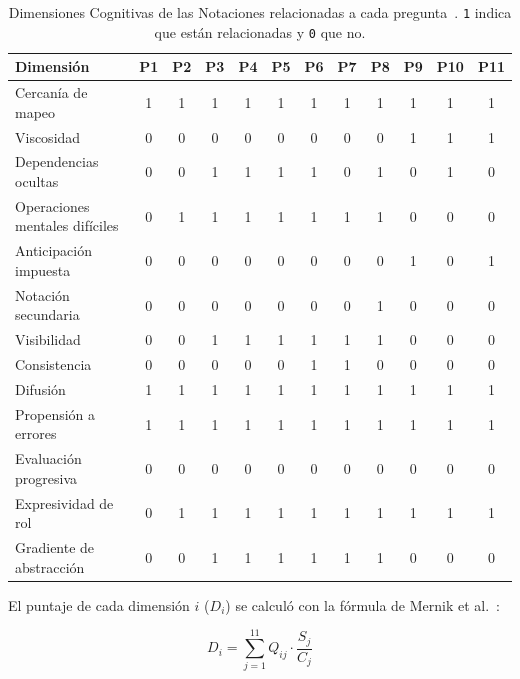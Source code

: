 \begin{table}[htbp]
\centering
\setlength{\tabcolsep}{4pt}
\begin{tabular}{|l|c|c|c|c|c|c|c|c|c|c|c|}
\hline
\textbf{Dimensión} & \textbf{P1} & \textbf{P2} & \textbf{P3} & \textbf{P4} & \textbf{P5} & \textbf{P6} & \textbf{P7} & \textbf{P8} & \textbf{P9} & \textbf{P10} & \textbf{P11} \\
\hline
Cercanía de mapeo & 1 & 1 & 1 & 1 & 1 & 1 & 1 & 1 & 1 & 1 & 1 \\
\hline
Viscosidad & 0 & 0 & 0 & 0 & 0 & 0 & 0 & 0 & 1 & 1 & 1 \\
\hline
Dependencias ocultas & 0 & 0 & 1 & 1 & 1 & 1 & 0 & 1 & 0 & 1 & 0 \\
\hline
Operaciones mentales difíciles & 0 & 1 & 1 & 1 & 1 & 1 & 1 & 1 & 0 & 0 & 0 \\
\hline
Anticipación impuesta & 0 & 0 & 0 & 0 & 0 & 0 & 0 & 0 & 1 & 0 & 1 \\
\hline
Notación secundaria & 0 & 0 & 0 & 0 & 0 & 0 & 0 & 1 & 0 & 0 & 0 \\
\hline
Visibilidad & 0 & 0 & 1 & 1 & 1 & 1 & 1 & 1 & 0 & 0 & 0 \\
\hline
Consistencia & 0 & 0 & 0 & 0 & 0 & 1 & 1 & 0 & 0 & 0 & 0 \\
\hline
Difusión & 1 & 1 & 1 & 1 & 1 & 1 & 1 & 1 & 1 & 1 & 1 \\
\hline
Propensión a errores & 1 & 1 & 1 & 1 & 1 & 1 & 1 & 1 & 1 & 1 & 1 \\
\hline
Evaluación progresiva & 0 & 0 & 0 & 0 & 0 & 0 & 0 & 0 & 0 & 0 & 0 \\
\hline
Expresividad de rol & 0 & 1 & 1 & 1 & 1 & 1 & 1 & 1 & 1 & 1 & 1 \\
\hline
Gradiente de abstracción & 0 & 0 & 1 & 1 & 1 & 1 & 1 & 1 & 0 & 0 & 0 \\
\hline
\end{tabular}
\caption[Dimensiones Cognitivas de las Notaciones relacionadas a cada pregunta. \texttt{1} indica que están relacionadas y \texttt{0} que no.]{Dimensiones Cognitivas de las Notaciones relacionadas a cada pregunta~\cite{mernikPDFComparisonXAML2009}. \texttt{1} indica que están relacionadas y \texttt{0} que no.}
\label{cuadro1}
\end{table}

El puntaje de cada dimensión $i$ ($D_i$) se calculó con la fórmula de Mernik et al.~\cite{mernikPDFComparisonXAML2009}:

\[ D_i = \sum_{j=1}^{11} Q_{ij} \cdot \frac{S_j}{C_j} \]

